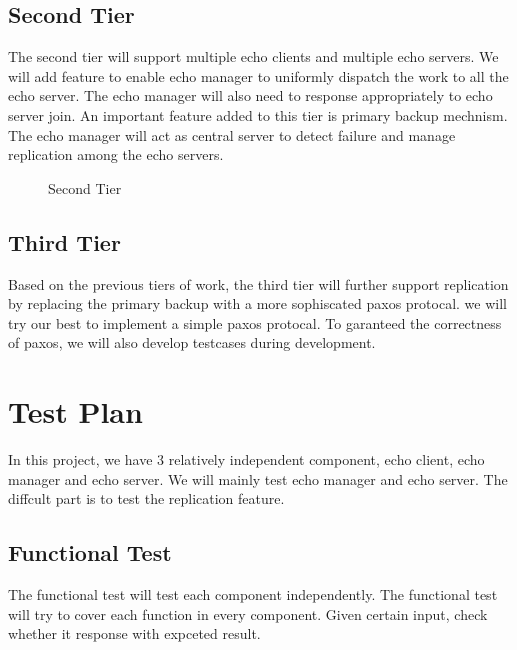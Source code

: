 \documentclass[12pt]{article}
\begin{document}
\subsection{Second Tier}
The second tier will support multiple echo clients and multiple echo servers. 
We will add feature to enable echo manager to uniformly dispatch the work 
to all the echo server. The echo manager will also need to response appropriately 
to echo server join. An important feature added to this tier is primary backup mechnism.
The echo manager will act as central server to detect failure and manage replication
among the echo servers.

\begin{figure}[H]
\caption{Second Tier}
\label{fig:speciation}
\end{figure}

\subsection{Third Tier}
Based on the previous tiers of work, the third tier will further support 
replication by replacing the primary backup with a more sophiscated paxos protocal. 
we will try our best to implement a simple paxos protocal. To garanteed the 
correctness of paxos, we will also develop testcases during development.

\section{Test Plan}
In this project, we have 3 relatively independent component, echo client, 
echo manager and echo server. We will mainly test echo manager and echo
server. The diffcult part is to test the replication feature.

\subsection{Functional Test}
The functional test will test each component independently. The functional test 
will try to cover each function in every component. Given certain input, check
whether it response with expceted result.
\end{document}
